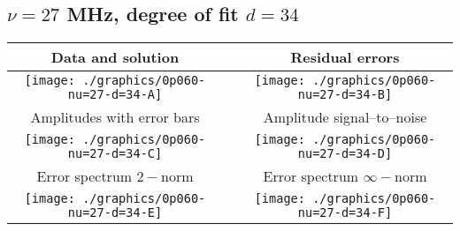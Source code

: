 

% 

\clearpage{}
\break{}

\subsection{$\nu = 27$ MHz, degree of fit $d = 34$}

\begin{table}[h]
    \begin{center}
        \begin{tabular}{ccc}
            Data and solution & \quad & Residual errors \\\hline
            \texttt{[image: ./graphics/0p060-nu=27-d=34-A]} &&
            \texttt{[image: ./graphics/0p060-nu=27-d=34-B]} \\[15pt]
            Amplitudes with error bars && Amplitude signal--to--noise \\\hline
            \texttt{[image: ./graphics/0p060-nu=27-d=34-C]} &&
            \texttt{[image: ./graphics/0p060-nu=27-d=34-D]} \\[15pt]
            Error spectrum $2-$norm && Error spectrum $\infty-$norm \\\hline
            \texttt{[image: ./graphics/0p060-nu=27-d=34-E]} &&
            \texttt{[image: ./graphics/0p060-nu=27-d=34-F]} \\[15pt]
        \end{tabular}
    \end{center}
\label{fig:elev=60, nu=27}
\end{table}



\endinput
